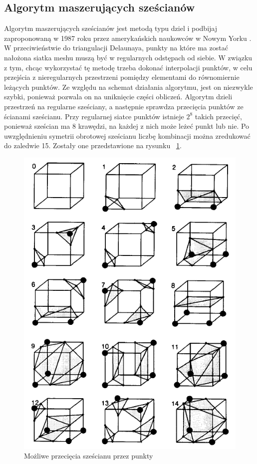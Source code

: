 \subsection{Algorytm maszerujących sześcianów}
Algorytm maszerujących sześcianów jest metodą typu dziel i podbijaj zaproponowaną w 1987 roku przez amerykańskich naukowców w Nowym Yorku \cite{lorensen1987marching}. W przeciwieństwie do triangulacji Delaunaya, punkty na które ma zostać nałożona siatka meshu muszą być w regularnych odstępach od siebie. W związku z tym, chcąc wykorzystać tę metodę trzeba dokonać interpolacji punktów, w celu przejścia z nieregularnych przestrzeni pomiędzy elementami do równomiernie leżących punktów. Ze względu na schemat działania algorytmu, jest on niezwykle szybki, ponieważ pozwala on na uniknięcie części obliczeń. Algorytm dzieli przestrzeń na regularne sześciany, a następnie sprawdza przecięcia punktów ze ścianami sześcianu. Przy regularnej siatce punktów istnieje $2^8$ takich przecięć, ponieważ sześcian ma 8 krawędzi, na każdej z nich może leżeć punkt lub nie. Po uwzględnieniu symetrii obrotowej sześcianu liczbę kombinacji można zredukować do zaledwie 15. Zostały one przedstawione na rysunku ~\ref{fig:marchingCubesCut}.
\begin{figure}[H]
  \centering
  \includegraphics[scale=0.5]{przeciecia.PNG}
  \caption{Możliwe przecięcia sześcianu przez punkty \cite{lorensen1987marching}}   
  \label{fig:marchingCubesCut}
\end{figure}
